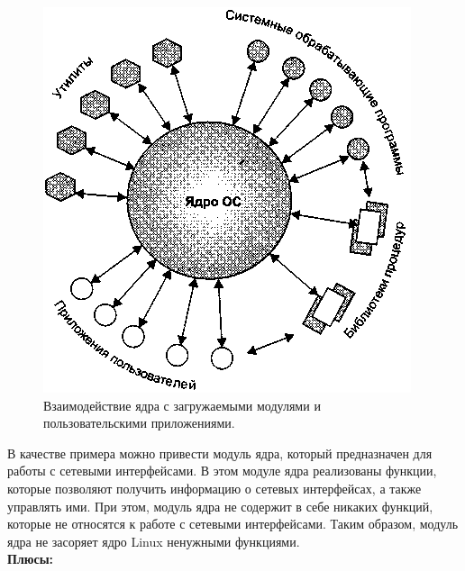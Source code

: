 \begin{figure}[h]
    \centering
    \includegraphics[width=\textwidth]{inc/img/lkm}
    \caption{Взаимодействие ядра с загружаемыми модулями и пользовательскими приложениями.}
    \label{fig:lkm}
\end{figure}

В качестве примера можно привести модуль ядра, который предназначен для работы с сетевыми интерфейсами.
В этом модуле ядра реализованы функции, которые позволяют получить информацию о сетевых интерфейсах, а также управлять ими.
При этом, модуль ядра не содержит в себе никаких функций, которые не относятся к работе с сетевыми интерфейсами.
Таким образом, модуль ядра не засоряет ядро Linux ненужными функциями.
\vspace{1mm}\\
\textbf{Плюсы:}

